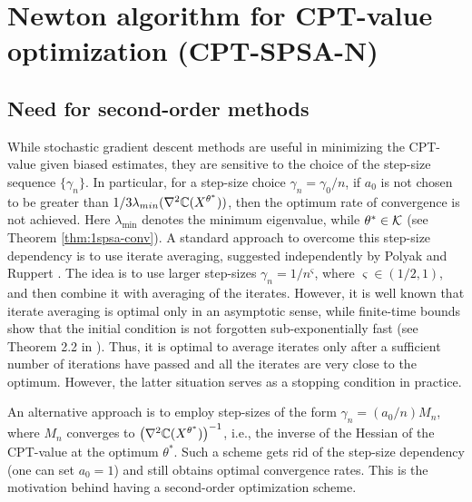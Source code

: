 \documentclass[11pt,letterpaper,english]{article}
\begin{document}


\section{Newton algorithm for CPT-value optimization (CPT-SPSA-N)}
\label{sec:2spsa}
\subsection{Need for second-order methods}
While stochastic gradient descent methods are useful in minimizing the CPT-value given biased estimates, they are sensitive to the choice of the step-size sequence $\{\gamma_n\}$.  In particular, for a step-size choice $\gamma_n = \gamma_0/n$, if $a_0$ is not chosen to be greater than $1/3 \lambda_{min}(\nabla^2 \mathbb{C}(X^{\theta^*}))$, then the optimum rate of convergence is not achieved. Here $\lambda_{\min}$ denotes the minimum eigenvalue, while $\theta^*\in \mathcal{K}$ (see Theorem \ref{thm:1spsa-conv}). A standard approach to overcome this step-size dependency is to use iterate averaging, suggested independently by Polyak \cite{polyak1992acceleration} and Ruppert \cite{ruppert1991stochastic}. The idea is to use larger step-sizes $\gamma_n = 1/n^\varsigma$, where $\varsigma \in (1/2,1)$, and then combine it with averaging of the iterates. However, it is well known  that iterate averaging is optimal only in an asymptotic sense, while finite-time bounds show that the initial condition is not forgotten sub-exponentially fast (see 
Theorem 2.2 in \cite{fathi2013transport}). Thus, it is optimal to average iterates only 
after a sufficient number of iterations have passed and all the iterates are very close to the optimum. However, the latter situation serves as a stopping condition in practice.

An alternative approach is to employ step-sizes of the form $\gamma_n = (a_0/n) M_n$, where $M_n$ converges to $\left(\nabla^2 \mathbb{C}(X^{\theta^*})\right)^{-1}$, i.e., the inverse of the Hessian of the CPT-value at the optimum $\theta^*$. Such a scheme gets rid of the step-size dependency (one can set $a_0=1$) and still obtains optimal convergence rates. This is the motivation behind having a second-order optimization scheme.
\end{document}
